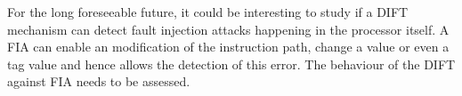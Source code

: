 For the long foreseeable future, it could be interesting to study if a DIFT mechanism can detect fault injection attacks happening in the processor itself. A FIA can enable an modification of the instruction path, change a value or even a tag value and hence allows the detection of this error. The behaviour of the DIFT against FIA needs to be assessed.


